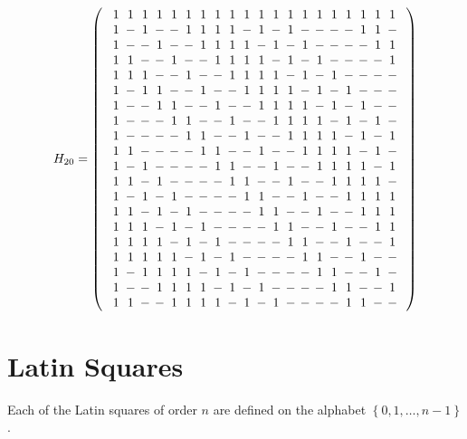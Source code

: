 $$H_{20}=
\left(\begin{array}{c}
\Zp\Zp\Zp\Zp\Zp\Zp\Zp\Zp\Zp\Zp\Zp\Zp\Zp\Zp\Zp\Zp\Zp\Zp\Zp\Zp\\
\Zp\Zm\Zp\Zm\Zm\Zp\Zp\Zp\Zp\Zm\Zp\Zm\Zp\Zm\Zm\Zm\Zm\Zp\Zp\Zm\\
\Zp\Zm\Zm\Zp\Zm\Zm\Zp\Zp\Zp\Zp\Zm\Zp\Zm\Zp\Zm\Zm\Zm\Zm\Zp\Zp\\
\Zp\Zp\Zm\Zm\Zp\Zm\Zm\Zp\Zp\Zp\Zp\Zm\Zp\Zm\Zp\Zm\Zm\Zm\Zm\Zp\\
\Zp\Zp\Zp\Zm\Zm\Zp\Zm\Zm\Zp\Zp\Zp\Zp\Zm\Zp\Zm\Zp\Zm\Zm\Zm\Zm\\
\Zp\Zm\Zp\Zp\Zm\Zm\Zp\Zm\Zm\Zp\Zp\Zp\Zp\Zm\Zp\Zm\Zp\Zm\Zm\Zm\\
\Zp\Zm\Zm\Zp\Zp\Zm\Zm\Zp\Zm\Zm\Zp\Zp\Zp\Zp\Zm\Zp\Zm\Zp\Zm\Zm\\
\Zp\Zm\Zm\Zm\Zp\Zp\Zm\Zm\Zp\Zm\Zm\Zp\Zp\Zp\Zp\Zm\Zp\Zm\Zp\Zm\\
\Zp\Zm\Zm\Zm\Zm\Zp\Zp\Zm\Zm\Zp\Zm\Zm\Zp\Zp\Zp\Zp\Zm\Zp\Zm\Zp\\
\Zp\Zp\Zm\Zm\Zm\Zm\Zp\Zp\Zm\Zm\Zp\Zm\Zm\Zp\Zp\Zp\Zp\Zm\Zp\Zm\\
\Zp\Zm\Zp\Zm\Zm\Zm\Zm\Zp\Zp\Zm\Zm\Zp\Zm\Zm\Zp\Zp\Zp\Zp\Zm\Zp\\
\Zp\Zp\Zm\Zp\Zm\Zm\Zm\Zm\Zp\Zp\Zm\Zm\Zp\Zm\Zm\Zp\Zp\Zp\Zp\Zm\\
\Zp\Zm\Zp\Zm\Zp\Zm\Zm\Zm\Zm\Zp\Zp\Zm\Zm\Zp\Zm\Zm\Zp\Zp\Zp\Zp\\
\Zp\Zp\Zm\Zp\Zm\Zp\Zm\Zm\Zm\Zm\Zp\Zp\Zm\Zm\Zp\Zm\Zm\Zp\Zp\Zp\\
\Zp\Zp\Zp\Zm\Zp\Zm\Zp\Zm\Zm\Zm\Zm\Zp\Zp\Zm\Zm\Zp\Zm\Zm\Zp\Zp\\
\Zp\Zp\Zp\Zp\Zm\Zp\Zm\Zp\Zm\Zm\Zm\Zm\Zp\Zp\Zm\Zm\Zp\Zm\Zm\Zp\\
\Zp\Zp\Zp\Zp\Zp\Zm\Zp\Zm\Zp\Zm\Zm\Zm\Zm\Zp\Zp\Zm\Zm\Zp\Zm\Zm\\
\Zp\Zm\Zp\Zp\Zp\Zp\Zm\Zp\Zm\Zp\Zm\Zm\Zm\Zm\Zp\Zp\Zm\Zm\Zp\Zm\\
\Zp\Zm\Zm\Zp\Zp\Zp\Zp\Zm\Zp\Zm\Zp\Zm\Zm\Zm\Zm\Zp\Zp\Zm\Zm\Zp\\
\Zp\Zp\Zm\Zm\Zp\Zp\Zp\Zp\Zm\Zp\Zm\Zp\Zm\Zm\Zm\Zm\Zp\Zp\Zm\Zm
\end{array}\right)
$$

\section[Latin Squares]{Latin Squares}
\label{sec:latin-sqr}

Each of the Latin squares of order $n$ are defined on the alphabet $\left\{0,1,\dots,n-1\right\}$.

